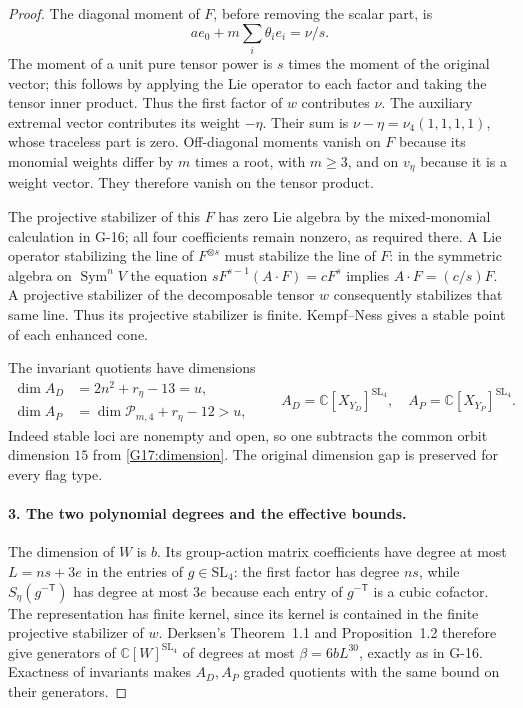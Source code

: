 \begin{proof}
The diagonal moment of $F$, before removing the scalar part, is
\[
 a e_0+m\sum_i\theta_i e_i=\nu/s.
\]
The moment of a unit pure tensor power is $s$ times the moment of
the original vector; this follows by applying the Lie operator to
each factor and taking the tensor inner product. Thus the first
factor of $w$ contributes $\nu$. The auxiliary extremal vector
contributes its weight $-\eta$. Their sum is
$\nu-\eta=\nu_4(1,1,1,1)$, whose traceless part is zero.
Off-diagonal moments vanish on $F$ because its monomial weights
differ by $m$ times a root, with $m\geq3$, and on $v_\eta$ because
it is a weight vector. They therefore vanish on the tensor product.

The projective stabilizer of this $F$ has zero Lie algebra by the
mixed-monomial calculation in G-16; all four coefficients remain
nonzero, as required there. A Lie operator stabilizing the line of
$F^{\otimes s}$ must stabilize the line of $F$: in the symmetric
algebra on $\operatorname{Sym}^n V$ the equation
$sF^{s-1}(A\cdot F)=cF^s$ implies $A\cdot F=(c/s)F$.
A projective stabilizer of the decomposable tensor $w$ consequently
stabilizes that same line. Thus its projective stabilizer is finite.
Kempf--Ness gives a stable point of each enhanced cone.

The invariant quotients have dimensions
\begin{equation}\label{G17:quotdims}
 \begin{split}
 \dim A_D&=2n^2+r_\eta-13=u,\\
 \dim A_P&=\dim\mathcal P_{m,4}+r_\eta-12>u,
 \end{split}
 \qquad A_D=\mathbb C[X_{Y_D}]^{\mathrm{SL}_4},\quad
 A_P=\mathbb C[X_{Y_P}]^{\mathrm{SL}_4}.
\end{equation}
Indeed stable loci are nonempty and open, so one subtracts the
common orbit dimension $15$ from \eqref{G17:dimension}.
The original dimension gap is preserved for every flag type.

\paragraph{3. The two polynomial degrees and the effective bounds.}
The dimension of $W$ is $b$. Its group-action matrix coefficients
have degree at most $L=ns+3e$ in the entries of $g\in\mathrm{SL}_4$:
the first factor has degree $ns$, while $S_\eta(g^{-\mathsf T})$
has degree at most $3e$ because each entry of $g^{-\mathsf T}$ is
a cubic cofactor. The representation has finite kernel, since its
kernel is contained in the finite projective stabilizer of $w$.
Derksen's Theorem~1.1 and Proposition~1.2 therefore give generators
of $\mathbb C[W]^{\mathrm{SL}_4}$ of degrees at most
$\beta=6bL^{30}$, exactly as in G-16. Exactness of invariants makes
$A_D,A_P$ graded quotients with the same bound on their generators.


\end{proof}
